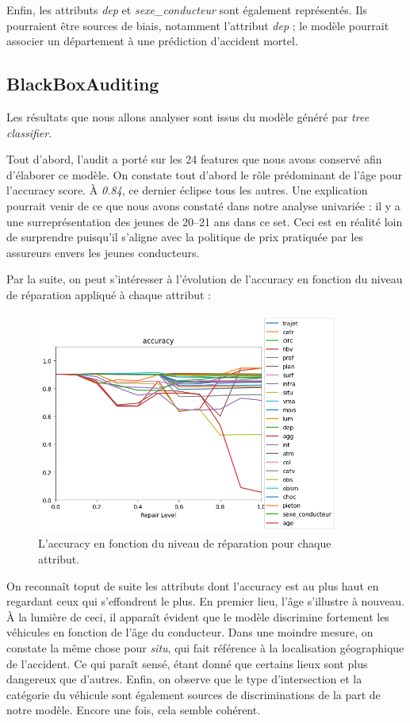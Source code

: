 \documentclass{article}
\begin{document}
    Enfin, les attributs \textit{dep} et \textit{sexe\_conducteur} sont également représentés. Ils pourraient être sources de biais, notamment 
    l'attribut \textit{dep} ; le modèle pourrait associer un département à une prédiction d'accident mortel.


    \subsection{BlackBoxAuditing}
    Les résultats que nous allons analyser sont issus du modèle généré par \textit{tree classifier}.

    Tout d'abord, l'audit a porté sur les 24 features que nous avons conservé afin d'élaborer ce modèle. 
    On constate tout d'abord le rôle prédominant de l'âge pour l'accuracy score. À \textit{0.84}, ce dernier éclipse 
    tous les autres. Une explication pourrait venir de ce que nous avons constaté dans notre analyse univariée : il y a une 
    surreprésentation des jeunes de 20--21 ans dans ce set. Ceci est en réalité loin de surprendre puisqu'il s'aligne avec la 
    politique de prix pratiquée par les assureurs envers les jeunes conducteurs.

    Par la suite, on peut s'intéresser à l'évolution de l'accuracy en fonction du niveau de réparation appliqué à chaque 
    attribut :

    \begin{figure}[h]
        \centering
        \includegraphics[width=10cm]{./img/accuracy.png}
        \caption{L'accuracy en fonction du niveau de réparation pour chaque attribut.}
    \end{figure}

    On reconnaît toput de suite les 
    attributs dont l'accuracy est au plus haut en regardant ceux qui s'effondrent le plus. En premier lieu, l'âge s'illustre
    à nouveau. À la lumière de ceci, il apparaît évident que le modèle discrimine fortement les véhicules en fonction de l'âge du 
    conducteur. Dans une moindre mesure, on constate la même chose pour \textit{situ}, qui fait référence à la localisation 
    géographique de l'accident. Ce qui paraît sensé, étant donné que certains lieux sont plus dangereux que d'autres. Enfin, 
    on observe que le type d'intersection et la catégorie du véhicule sont également sources de discriminations de la part de notre 
    modèle. Encore une fois, cela semble cohérent.
\end{document}
